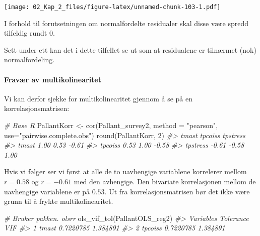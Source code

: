 \documentclass[
]{article}
\newenvironment{Shaded}{\begin{snugshade}}{\end{snugshade}}
\newcommand{\AttributeTok}[1]{\textcolor[rgb]{0.77,0.63,0.00}{#1}}
\newcommand{\CommentTok}[1]{\textcolor[rgb]{0.56,0.35,0.01}{\textit{#1}}}
\newcommand{\DecValTok}[1]{\textcolor[rgb]{0.00,0.00,0.81}{#1}}
\newcommand{\FunctionTok}[1]{\textcolor[rgb]{0.00,0.00,0.00}{#1}}
\newcommand{\NormalTok}[1]{#1}
\newcommand{\OtherTok}[1]{\textcolor[rgb]{0.56,0.35,0.01}{#1}}
\newcommand{\StringTok}[1]{\textcolor[rgb]{0.31,0.60,0.02}{#1}}
\begin{document}
\texttt{[image: 02\_Kap\_2\_files/figure-latex/unnamed-chunk-103-1.pdf]}

I forhold til forutsetningen om normalfordelte residualer skal disse være spredd tilfeldig rundt 0.

Sett under ett kan det i dette tilfellet se ut som at residualene er tilnærmet (nok) normalfordeling.

\hypertarget{fravuxe6r-av-multikolinearitet-1}{%
\paragraph{Fravær av multikolinearitet}\label{fravuxe6r-av-multikolinearitet-1}}

Vi kan derfor sjekke for multikolinearitet gjennom å se på en korrelasjonsmatrisen:

\begin{Shaded}
\begin{Highlighting}[]
\CommentTok{\# Base R}
\NormalTok{PallantKorr }\OtherTok{\textless{}{-}} \FunctionTok{cor}\NormalTok{(Pallant\_survey2, }\AttributeTok{method =} \StringTok{"pearson"}\NormalTok{, }\AttributeTok{use=}\StringTok{"pairwise.complete.obs"}\NormalTok{)}
\FunctionTok{round}\NormalTok{(PallantKorr, }\DecValTok{2}\NormalTok{)}
\CommentTok{\#\textgreater{}          tmast tpcoiss tpstress}
\CommentTok{\#\textgreater{} tmast     1.00    0.53    {-}0.61}
\CommentTok{\#\textgreater{} tpcoiss   0.53    1.00    {-}0.58}
\CommentTok{\#\textgreater{} tpstress {-}0.61   {-}0.58     1.00}
\end{Highlighting}
\end{Shaded}

Hvis vi følger \citet{pallantSPSSSurvivalManual2010} ser vi først at alle de to uavhengige variablene korrelerer mellom \(r=0.58\) og \(r=-0.61\) med den avhengige. Den bivariate korrelasjonen mellom de uavhengige variablene er på \(0.53\). Ut fra korrelasjonsmatrisen bør det ikke være grunn til å frykte multikolinearitet.

\begin{Shaded}
\begin{Highlighting}[]
\CommentTok{\# Bruker pakken. olsrr}
\FunctionTok{ols\_vif\_tol}\NormalTok{(PallantOLS\_reg2)}
\CommentTok{\#\textgreater{}   Variables Tolerance      VIF}
\CommentTok{\#\textgreater{} 1     tmast 0.7220785 1.384891}
\CommentTok{\#\textgreater{} 2   tpcoiss 0.7220785 1.384891}
\end{Highlighting}
\end{Shaded}
\end{document}
